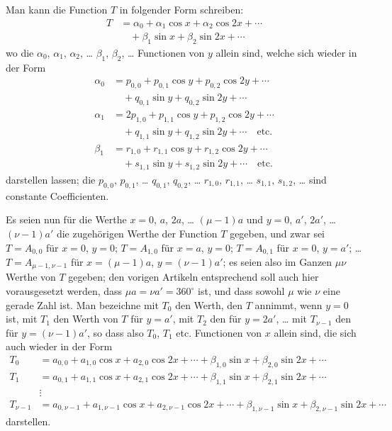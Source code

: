 \documentclass[12pt,a4paper]{article}
\begin{document}
Man kann die Function $T$ in folgender Form schreiben:
\begin{equation}
\tag{2}
\begin{aligned}
T &= \alpha_0 + \alpha_1 \cos x + \alpha_2 \cos 2x + \cdots \\
&\quad + \beta_1 \sin x + \beta_2 \sin 2x + \cdots
\end{aligned}
\end{equation}
wo die $\alpha_0$, $\alpha_1$, $\alpha_2$, \ldots{} $\beta_1$, $\beta_2$, \ldots{} Functionen von $y$ allein sind, welche sich wieder in der Form
\begin{equation}
\tag{3}
\begin{aligned}
\alpha_0 &= p_{0,0} + p_{0,1} \cos y + p_{0,2} \cos 2y + \cdots \\
&\quad + q_{0,1} \sin y + q_{0,2} \sin 2y + \cdots\\
\alpha_1 &= 2p_{1,0} + p_{1,1} \cos y + p_{1,2} \cos 2y + \cdots \\
&\quad + q_{1,1} \sin y + q_{1,2} \sin 2y + \cdots \quad \text{etc.}\\
\beta_1 &= r_{1,0} + r_{1,1} \cos y + r_{1,2} \cos 2y + \cdots \\
&\quad + s_{1,1} \sin y + s_{1,2} \sin 2y + \cdots \quad \text{etc.}
\end{aligned}
\end{equation}
darstellen lassen; die $p_{0,0}$, $p_{0,1}$, \ldots{} $q_{0,1}$, $q_{0,2}$, \ldots{} $r_{1,0}$, $r_{1,1}$, \ldots{} $s_{1,1}$, $s_{1,2}$, \ldots{} sind constante Coefficienten.

Es seien nun für die Werthe $x = 0$, $a$, $2a$, \ldots{} $(\mu-1)a$ und $y = 0$, $a'$, $2a'$, \ldots{} $(\nu-1)a'$ die zugehörigen Werthe der Function $T$ gegeben, und zwar sei $T = A_{0,0}$ für $x = 0$, $y = 0$; $T = A_{1,0}$ für $x = a$, $y = 0$; $T = A_{0,1}$ für $x = 0$, $y = a'$; \ldots{} $T = A_{\mu-1,\nu-1}$ für $x = (\mu-1)a$, $y = (\nu-1)a'$; es seien also im Ganzen $\mu\nu$ Werthe von $T$ gegeben; den vorigen Artikeln entsprechend soll auch hier vorausgesetzt werden, dass $\mu a = \nu a' = 360^{\circ}$ ist, und dass sowohl $\mu$ wie $\nu$ eine gerade Zahl ist. Man bezeichne mit $T_0$ den Werth, den $T$ annimmt, wenn $y = 0$ ist, mit $T_1$ den Werth von $T$ für $y = a'$, mit $T_2$ den für $y = 2a'$, \ldots{} mit $T_{\nu-1}$ den für $y = (\nu-1)a'$, so dass also $T_0$, $T_1$ etc. Functionen von $x$ allein sind, die sich auch wieder in der Form
\begin{align*}
T_0 &= a_{0,0} + a_{1,0} \cos x + a_{2,0} \cos 2x + \cdots + \beta_{1,0} \sin x + \beta_{2,0} \sin 2x + \cdots\\
T_1 &= a_{0,1} + a_{1,1} \cos x + a_{2,1} \cos 2x + \cdots + \beta_{1,1} \sin x + \beta_{2,1} \sin 2x + \cdots\\
&\vdots\\
T_{\nu-1} &= a_{0,\nu-1} + a_{1,\nu-1} \cos x + a_{2,\nu-1} \cos 2x + \cdots + \beta_{1,\nu-1} \sin x + \beta_{2,\nu-1} \sin 2x + \cdots
\end{align*}
darstellen.
\end{document}

